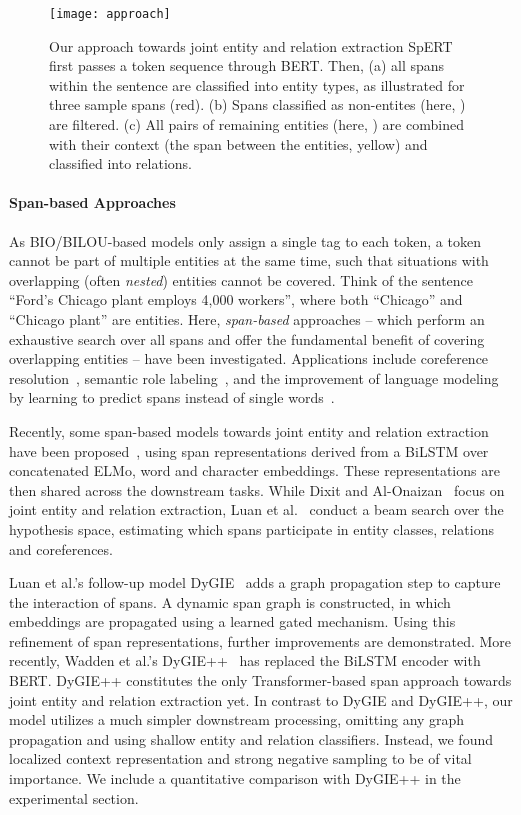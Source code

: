 \documentclass{ecai}
\begin{document}
\begin{figure*}
    \centering
    \texttt{[image: approach]}
    \caption{Our approach towards joint entity and relation extraction SpERT first passes a token sequence through BERT. Then, (a) all spans within the sentence are classified into entity types, as illustrated for three sample spans  (red). (b) Spans classified as non-entites (here, ) are filtered. (c) All pairs of remaining entities (here, ) are combined with their context (the span between the entities, yellow) and classified into relations.
    }
    \label{fig:approach}
\end{figure*}

\paragraph{Span-based Approaches} As BIO/BILOU-based models only assign a single tag to each token, a token cannot be part of multiple entities at the same time, such that situations with overlapping (often {\it nested}) entities cannot be covered. Think of 
the sentence ``Ford's Chicago plant employs 4,000 workers'', where both ``Chicago'' and ``Chicago plant'' are entities.
Here, {\it span-based} approaches -- which perform an exhaustive search over all spans and offer the fundamental benefit of covering overlapping entities -- have been investigated. Applications include coreference resolution~\cite{lee:2017:span_coreference,lee:2018:span_coreference}, semantic role labeling~\cite{ouchi:2018:span_srl, he:2018:span_srl}, and the improvement of language modeling by learning to predict spans instead of single words~\cite{joshi:2019:span_bert}. 

Recently, some span-based models towards joint entity and relation extraction have been proposed~\cite{luan:2018:scierc,dixit:2019:span_rel}, using span representations derived from a BiLSTM over concatenated ELMo, word and character embeddings. These representations are then shared across the downstream tasks. 
While Dixit and Al-Onaizan~\cite{dixit:2019:span_rel} focus on joint entity and relation extraction, Luan et al.~\cite{luan:2018:scierc} conduct a beam search over the hypothesis space, estimating which spans participate in entity classes, relations and coreferences. 

Luan et al.'s follow-up model DyGIE~\cite{luan:2019:span_graphs} adds a graph propagation step to capture the interaction of spans. A dynamic span graph is constructed, in which embeddings are propagated using a learned gated mechanism. Using this refinement of span representations, further improvements are demonstrated.
More recently, Wadden et al.'s DyGIE++~\cite{wadden:2019:dygie++} has replaced the BiLSTM encoder with BERT. DyGIE++ constitutes the only Transformer-based span approach towards joint entity and relation extraction yet.
In contrast to DyGIE and DyGIE++, our model utilizes a much simpler downstream processing, omitting any graph propagation and using shallow entity and relation classifiers. Instead, we found localized context representation and strong negative sampling to be of vital importance. We include a quantitative comparison with DyGIE++ in the experimental section.
\end{document}
